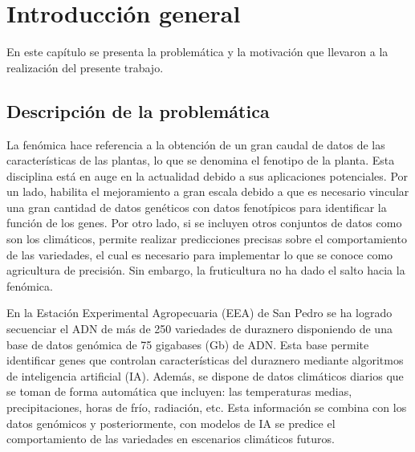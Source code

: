 
\chapter{Introducción general} %

\label{Chapter1} %
\label{IntroGeneral}


\newcommand{\keyword}[1]{\textbf{#1}}
\newcommand{\tabhead}[1]{\textbf{#1}}
\newcommand{\code}[1]{\texttt{#1}}
\newcommand{\file}[1]{\texttt{\bfseries#1}}
\newcommand{\option}[1]{\texttt{\itshape#1}}
\newcommand{\grados}{$^{\circ}$}




En este capítulo se presenta la problemática y la motivación que llevaron a la realización del presente trabajo.

\section{Descripción de la problemática}

La fenómica hace referencia a la obtención de un gran caudal de datos de las características de las plantas, lo que se denomina el fenotipo de la planta. Esta disciplina está en auge en la actualidad debido a sus aplicaciones potenciales. Por un lado, habilita el mejoramiento a gran escala debido a que es necesario vincular una gran cantidad de datos genéticos con datos fenotípicos para identificar la función de los genes. Por otro lado, si se incluyen otros conjuntos de datos como son los climáticos, permite realizar predicciones precisas sobre el comportamiento de las variedades, el cual es necesario para implementar lo que se conoce como agricultura de precisión. Sin embargo, la fruticultura no ha dado el salto hacia la fenómica.

En la  Estación Experimental Agropecuaria (EEA) de San Pedro se ha logrado secuenciar el ADN de más de 250 variedades de duraznero \cite{ARTICLE:1} disponiendo de una base de datos genómica de 75 gigabases (Gb) de ADN. Esta base permite identificar genes que controlan características del duraznero mediante algoritmos de inteligencia artificial (IA). Además, se dispone de datos climáticos diarios que se toman de forma automática que incluyen: las temperaturas medias, precipitaciones, horas de frío, radiación, etc. Esta información se combina con los datos genómicos y posteriormente, con modelos de IA se predice el comportamiento de las variedades en escenarios climáticos futuros.

